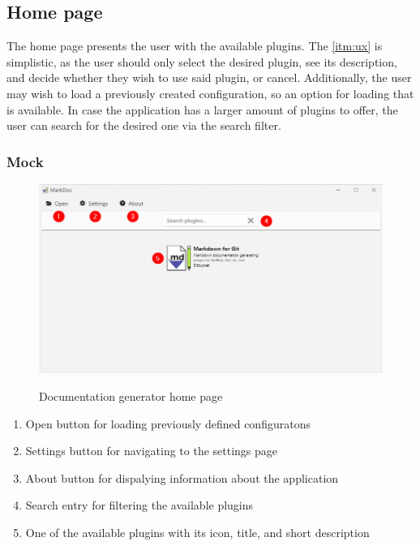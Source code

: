 \subsection{Home page}

The home page presents the user with the available plugins. The \ref{itm:ux} is simplistic, as the user should only select the desired plugin, see its description, and decide whether they wish to use said plugin, or cancel. Additionally, the user may wish to load a previously created configuration, so an option for loading that is available.
In case the application has a larger amount of plugins to offer, the user can search for the desired one via the search filter.

\subsubsection{Mock}

\begin{figure}[H]
    \includegraphics[width=\linewidth]{img/markDocHomePage.png}
    \label{fig:homePage}
    \caption{Documentation generator home page}
\end{figure}

\begin{enumerate}
    \item Open button for loading previously defined configuratons
    \item Settings button for navigating to the settings page
    \item About button for dispalying information about the application
    \item Search entry for filtering the available plugins
    \item One of the available plugins with its icon, title, and short description
\end{enumerate}


